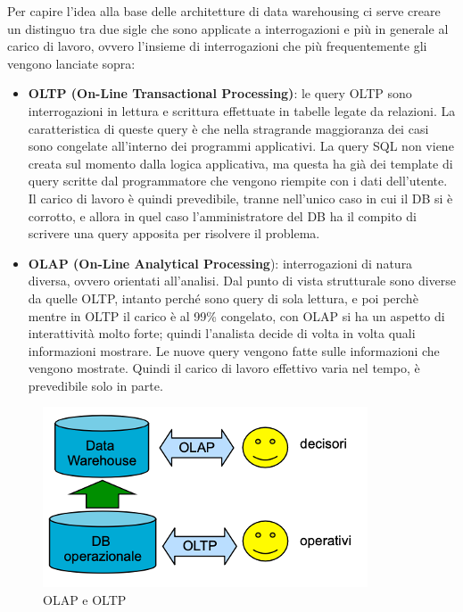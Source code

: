Per capire l’idea alla base delle architetture di data warehousing ci serve creare un distinguo tra due sigle che sono applicate a interrogazioni e più in generale al carico di lavoro, ovvero l’insieme di interrogazioni che più frequentemente gli vengono lanciate sopra:
\begin{itemize}
	\item 
	\textbf{OLTP (On-Line Transactional Processing)}: le query OLTP sono interrogazioni in lettura e scrittura effettuate in tabelle legate da relazioni. La caratteristica di queste query è che nella stragrande maggioranza dei casi sono congelate all’interno dei programmi applicativi. La query SQL non viene creata sul momento dalla logica applicativa, ma questa ha già dei template di query scritte dal programmatore che vengono riempite con i dati dell’utente. Il carico di lavoro è quindi prevedibile, tranne nell’unico caso in cui il DB si è corrotto, e allora in quel caso l’amministratore del DB ha il compito di scrivere una query apposita per risolvere il problema.
	\item 
	\textbf{OLAP (On-Line Analytical Processing}): interrogazioni di natura diversa, ovvero orientati all’analisi. Dal punto di vista strutturale sono diverse da quelle OLTP, intanto perché sono query di sola lettura, e poi perchè mentre  in OLTP il carico è al 99\% congelato, con OLAP si ha un aspetto di interattività molto forte; quindi l’analista decide di volta in volta quali informazioni mostrare. Le nuove query vengono fatte sulle informazioni che vengono mostrate. Quindi il carico di lavoro effettivo varia nel tempo, è prevedibile solo in parte.
\end{itemize}
\begin{figure}[H]
	\centering
	\includegraphics[width=0.7\linewidth]{img/DW}
	\caption{OLAP e OLTP}
	\label{fig:dw}
\end{figure}

